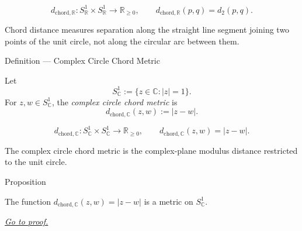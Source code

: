 \begin{remark*}
\[
d_{\mathrm{chord},\mathbb{R}}:
S^1_{\mathbb{R}}\times S^1_{\mathbb{R}}\to\mathbb{R}_{\geq 0},
\qquad
d_{\mathrm{chord},\mathbb{R}}(p,q)=d_2(p,q).
\]
\end{remark*}

\begin{remark*}[Interpretation]
Chord distance measures separation along the straight line segment joining two
points of the unit circle, not along the circular arc between them.
\end{remark*}


\DefinitionalRoot

\begin{definitionbox}{Definition --- Complex Circle Chord Metric}
\begin{definition}\label{def:complex-circle-chord-metric}
Let
\[
  S^1_{\mathbb{C}}
  :=
  \{z\in\mathbb{C}: |z|=1\}.
\]
For \(z,w\in S^1_{\mathbb{C}}\), the \emph{complex circle chord metric} is
\[
  d_{\mathrm{chord},\mathbb{C}}(z,w):=|z-w|.
\]
\end{definition}
\end{definitionbox}

\begin{remark*}
\[
d_{\mathrm{chord},\mathbb{C}}:
S^1_{\mathbb{C}}\times S^1_{\mathbb{C}}\to\mathbb{R}_{\geq 0},
\qquad
d_{\mathrm{chord},\mathbb{C}}(z,w)=|z-w|.
\]
\end{remark*}

\begin{remark*}[Interpretation]
The complex circle chord metric is the complex-plane modulus distance
restricted to the unit circle.
\end{remark*}


\DefinitionalRoot

\begin{propositionbox}{Proposition}
\begin{proposition}
\label{prop:complex-circle-chord-metric}
The function \(d_{\mathrm{chord},\mathbb{C}}(z,w)=|z-w|\) is a metric
on \(S^1_{\mathbb{C}}\).

\smallskip
\noindent
\hyperref[prf:complex-circle-chord-metric]{\textit{Go to proof.}}
\end{proposition}
\end{propositionbox}

